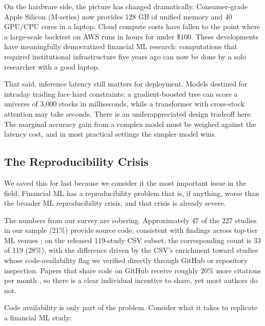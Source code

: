 On the hardware side, the picture has changed dramatically. Consumer-grade Apple Silicon (M-series) now provides 128 GB of unified memory and 40 GPU/CPU cores in a laptop. Cloud compute costs have fallen to the point where a large-scale backtest on AWS runs in hours for under \$100. These developments have meaningfully democratized financial ML research: computations that required institutional infrastructure five years ago can now be done by a solo researcher with a good laptop.

That said, inference latency still matters for deployment. Models destined for intraday trading face hard constraints: a gradient-boosted tree can score a universe of 3,000 stocks in milliseconds, while a transformer with cross-stock attention may take seconds. There is an underappreciated design tradeoff here. The marginal accuracy gain from a complex model must be weighed against the latency cost, and in most practical settings the simpler model wins.

\subsection{The Reproducibility Crisis}

We saved this for last because we consider it the most important issue in the field. Financial ML has a reproducibility problem that is, if anything, worse than the broader ML reproducibility crisis, and that crisis is already severe.

The numbers from our survey are sobering. Approximately 47 of the 227 studies in our sample (21\%) provide source code, consistent with findings across top-tier ML venues \citep{Pineau2021}; on the released 119-study CSV subset, the corresponding count is 33 of 119 (28\%), with the difference driven by the CSV's enrichment toward studies whose code-availability flag we verified directly through GitHub or repository inspection. Papers that share code on GitHub receive roughly 20\% more citations per month \citep{Hasselbring2024}, so there is a clear individual incentive to share, yet most authors do not.

Code availability is only part of the problem. Consider what it takes to replicate a financial ML study:

